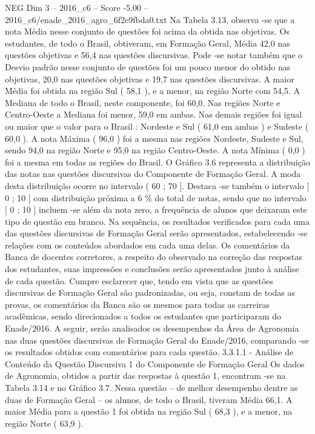\begin{textsample}{NEG Dim 3 – 2016\_c6 – Score -5.00 – 2016\_c6/enade\_2016\_agro\_6f2e9fbda0.txt}
Na Tabela 3.13, observa -se que a nota Média nesse conjunto de questões foi acima da obtida nas objetivas.
Os estudantes, de todo o Brasil, obtiveram, em Formação Geral, Média 42,0 nas questões objetivas e 56,4 nas questões discursivas.
Pode -se notar também que o Desvio padrão nesse conjunto de questões foi um pouco menor do obtido nas objetivas, 20,0 nas questões objetivas e 19,7 nas questões discursivas.
A maior Média foi obtida na região Sul ( 58,1 ), e a menor, na região Norte com 54,5.
A Mediana de todo o Brasil, neste componente, foi 60,0.
Nas regiões Norte e Centro-Oeste a Mediana foi menor, 59,0 em ambas.
Nas demais regiões foi igual ou maior que o valor para o Brasil : Nordeste e Sul ( 61,0 em ambas ) e Sudeste ( 60,0 ).
A nota Máxima ( 96,0 ) foi a mesma nas regiões Nordeste, Sudeste e Sul, sendo 94,0 na região Norte e 95,0 na região Centro-Oeste.
A nota Mínima ( 0,0 ) foi a mesma em todas as regiões do Brasil.
O Gráfico 3.6 representa a distribuição das notas nas questões discursivas do Componente de Formação Geral.
A moda desta distribuição ocorre no intervalo ( 60 ; 70 ].
Destaca -se também o intervalo [ 0 ; 10 ] com distribuição próxima a 6 \% do total de notas, sendo que no intervalo [ 0 ; 10 ] incluem -se além da nota zero, a frequência de alunos que deixaram este tipo de questão em branco.
Na sequência, os resultados verificados para cada uma das questões discursivas de Formação Geral serão apresentados, estabelecendo -se relações com os conteúdos abordados em cada uma delas.
Os comentários da Banca de docentes corretores, a respeito do observado na correção das respostas dos estudantes, suas impressões e conclusões serão apresentados junto à análise de cada questão.
Cumpre esclarecer que, tendo em vista que as questões discursivas de Formação Geral são padronizadas, ou seja, constam de todas as provas, os comentários da Banca são os mesmos para todas as carreiras acadêmicas, sendo direcionados a todos os estudantes que participaram do Enade/2016.
A seguir, serão analisados os desempenhos da Área de Agronomia nas duas questões discursivas de Formação Geral do Enade/2016, comparando -se os resultados obtidos com comentários para cada questão. 3.3.1.1 - Análise de Conteúdo da Questão Discursiva 1 do Componente de Formação Geral Os dados de Agronomia, obtidos a partir das respostas à questão 1, encontram -se na Tabela 3.14 e no Gráfico 3.7.
Nessa questão – de melhor desempenho dentre as duas de Formação Geral – os alunos, de todo o Brasil, tiveram Média 66,1.
A maior Média para a questão 1 foi obtida na região Sul ( 68,3 ), e a menor, na região Norte ( 63,9 ).

\end{textsample}

